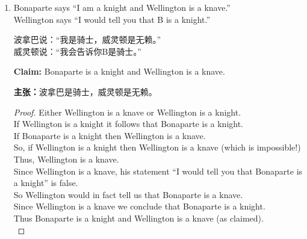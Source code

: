 \begin{enumerate}
\begin{enumerate}
  \textbf{Claim:} Natasha is a knight, and Boris is a knave.\\
  
  \textbf{主张：}娜塔莎是骑士，鲍里斯是无赖。\\
  
  \begin{proof} If Natasha is a knave, then Boris is a knight.\\
  If Boris is a knight, then Natasha is a knight.\\
  Therefore, if Natasha is a knave, then Natasha is a knight.\\
  Hence Natasha is a knight.\\
  Therefore, Boris is a knave.
  
  如果娜塔莎是无赖，那么鲍里斯是骑士。\\
  如果鲍里斯是骑士，那么娜塔莎是骑士。\\
  因此，如果娜塔莎是无赖，那么娜塔莎是骑士。\\
  所以娜塔莎是骑士。\\
  因此，鲍里斯是无赖。
  \end{proof}
  
  \item Bonaparte says ``I am a knight and Wellington is a knave.''\\
  Wellington says ``I would tell you that B is a knight.''
  
  波拿巴说：“我是骑士，威灵顿是无赖。”\\
  威灵顿说：“我会告诉你B是骑士。”
  
  \textbf{Claim:} Bonaparte is a knight and Wellington is a knave.
  
  \textbf{主张：}波拿巴是骑士，威灵顿是无赖。
  \begin{proof}
      Either Wellington is a knave or Wellington is a knight.\\
      If Wellington is a knight it follows that Bonaparte is a knight.\\
      If Bonaparte is a knight then Wellington is a knave. \\
      So, if Wellington is a knight then Wellington is a knave (which is impossible!)\\
      Thus, Wellington is a knave.\\
      Since Wellington is a knave, his statement ``I would tell you that Bonaparte is a knight'' is false. \\
      So Wellington would in fact tell us that Bonaparte is a knave. \\
      Since Wellington is a knave we conclude that Bonaparte is a knight.\\
      Thus Bonaparte is a knight and Wellington is a knave (as claimed).\\
  

\end{proof}
\end{enumerate}
\end{enumerate}
